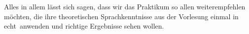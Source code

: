 \documentclass[IN,ngerman,utf8,12pt]{tumbook}
\begin{document}
Alles in allem lässt sich sagen, dass wir das Praktikum so allen weiterempfehlen möchten, die ihre theoretischen Sprachkenntnisse aus der Vorlesung einmal \glqq in echt\grqq\  anwenden und richtige Ergebnisse sehen wollen.


\clearpage
\appendix%
\listoffigures%
\end{document}
